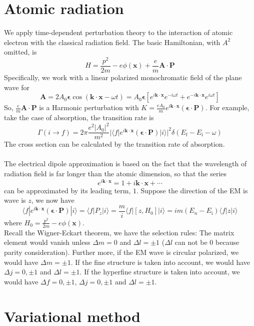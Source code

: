 \section{Atomic radiation}
We apply time-dependent perturbation theory to the interaction of atomic electron with the classical radiation field.
The basic Hamiltonian, with $A^2$ omitted, is
\[H = \frac{p^2}{2m} - e\phi(\bm{x}) + \frac{e}{m}\bm{A}\cdot\bm{P}\]
Specifically, we work with a linear polarized monochromatic field of the plane wave for
\[\bm{A} = 2A_0\bm{\epsilon}\cos(\bm{k}\cdot\bm{x}-\omega t) = A_0\bm{\epsilon} [e^{i\bm{k}\cdot\bm{x}}e^{-i\omega t}  + e^{-i\bm{k}\cdot\bm{x}}e^{i\omega t} ]\]
So, $\frac{e}{m}\bm{A}\cdot\bm{P}$ is a Harmonic perturbation with $K = \frac{eA_0}{m} e^{i\bm{k}\cdot\bm{x}} (\bm{\epsilon}\cdot\bm{P})$.
For example, take the case of absorption, the transition rate is
\[\Gamma(i \to f) = 2\pi \frac{e^2|A_0|^2}{m^2} |\langle f |e^{i\bm{k}\cdot\bm{x}} (\bm{\epsilon}\cdot\bm{P}) |i \rangle|^2 \delta(E_{\mathrm{f}}-E_{\mathrm{i}}-\omega)\]
The cross section can be calculated by the transition rate of absorption.\\ \\
The electrical dipole approximation is based on the fact that the wavelength of radiation field is far longer than the atomic dimension, so that the series
\[e^{i\bm{k}\cdot\bm{x}} = 1+ i\bm{k}\cdot\bm{x}+\cdots\]
can be approximated by its leading term, $1$. Suppose the direction of the EM is wave is $z$, we now have
\[\langle f |e^{i\bm{k}\cdot\bm{x}} (\bm{\epsilon}\cdot\bm{P}) |i \rangle = \langle f | P_z |i \rangle = \frac{m}{i} \langle f |  [z,H_0] |i \rangle = im(E_n-E_{\mathrm{i}})\langle f | z |i \rangle  \]
where $H_0 = \frac{p^2}{2m} - e\phi(\bm{x})$.\\
Recall the Wigner-Eckart theorem, we have the selection rules: The matrix element would vanish unless $\Delta m = 0$ and $\Delta l = \pm 1$ ($\Delta l $ can not be $0$ because parity consideration). Further more, if the EM wave is circular polarized, we would have $\Delta m = \pm 1$. If the fine structure is taken into account, we would have $\Delta j = 0,\pm 1$ and $\Delta l = \pm 1$. If the hyperfine structure is taken into account, we would have $\Delta f = 0,\pm 1$, $\Delta j = 0,\pm 1$ and $\Delta l = \pm 1$. 

\section{Variational method}
